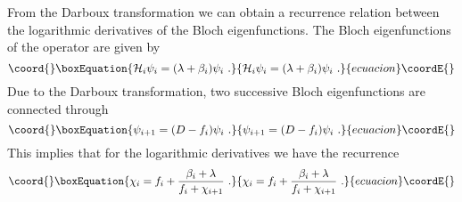 \documentclass[a4paper,11pt]{article}
\begin{document}
{}From the Darboux transformation we can obtain a recurrence relation
between the logarithmic derivatives of the Bloch eigenfunctions. The Bloch
eigenfunctions \coordHE{} of the operator \coordHE{} are given by
\begin{equation}\coord{}\boxEquation{
\label{Bloch}
{\cal H}_i\psi _i=(\lambda+\beta _i)\psi _i ~.
}{
{\cal H}_i\psi _i=(\lambda+\beta _i)\psi _i ~.
}{ecuacion}\coordE{}\end{equation}
Due to the Darboux transformation, two successive Bloch eigenfunctions are
connected through
\begin{equation}\coord{}\boxEquation{
\label{con}
\psi _{i+1}=(D-f_i)\psi _i ~.
}{
\psi _{i+1}=(D-f_i)\psi _i ~.
}{ecuacion}\coordE{}\end{equation}
This implies that for the logarithmic derivatives \coordHE{} we
have the recurrence
\begin{equation}\coord{}\boxEquation{
\label{rec_chi}
\chi_i=f_i+\frac{\beta_i+\lambda}{f_i+\chi_{i+1}} ~.
}{
\chi_i=f_i+\frac{\beta_i+\lambda}{f_i+\chi_{i+1}} ~.
}{ecuacion}\coordE{}\end{equation}
\end{document}
